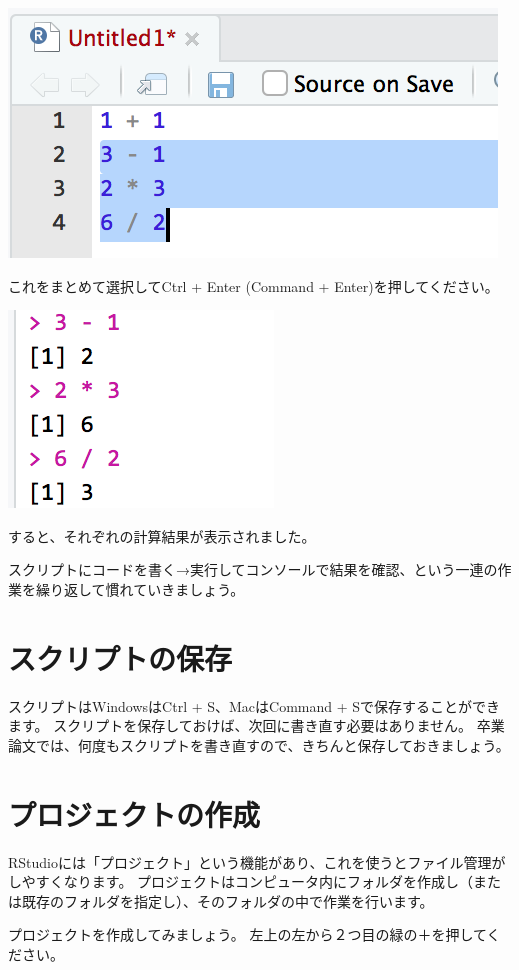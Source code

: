 \documentclass[
]{book}
\begin{document}
\begin{center}\includegraphics[width=0.4\linewidth]{image/basic3} \end{center}

これをまとめて選択してCtrl + Enter (Command + Enter)を押してください。

\begin{center}\includegraphics[width=0.2\linewidth]{image/basic4} \end{center}

すると、それぞれの計算結果が表示されました。

スクリプトにコードを書く→実行してコンソールで結果を確認、という一連の作業を繰り返して慣れていきましょう。

\hypertarget{ux30b9ux30afux30eaux30d7ux30c8ux306eux4fddux5b58}{%
\section{スクリプトの保存}\label{ux30b9ux30afux30eaux30d7ux30c8ux306eux4fddux5b58}}

スクリプトはWindowsはCtrl + S、MacはCommand + Sで保存することができます。
スクリプトを保存しておけば、次回に書き直す必要はありません。
卒業論文では、何度もスクリプトを書き直すので、きちんと保存しておきましょう。

\hypertarget{ux30d7ux30edux30b8ux30a7ux30afux30c8ux306eux4f5cux6210}{%
\section{プロジェクトの作成}\label{ux30d7ux30edux30b8ux30a7ux30afux30c8ux306eux4f5cux6210}}

RStudioには「プロジェクト」という機能があり、これを使うとファイル管理がしやすくなります。
プロジェクトはコンピュータ内にフォルダを作成し（または既存のフォルダを指定し）、そのフォルダの中で作業を行います。

プロジェクトを作成してみましょう。
左上の左から２つ目の緑の＋を押してください。
\end{document}
